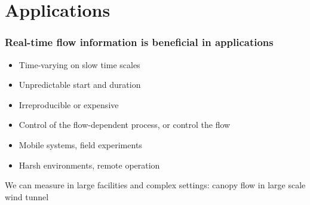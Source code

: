 %
% 
%
%
%
%
%

% 

\section{Applications}

\begin{frame}[label=app-1]
\frametitle{Real-time flow information is beneficial in applications}
\begin{itemize}
	\item Time-varying on slow time scales
    \item Unpredictable start and duration 
    \item Irreproducible or expensive %
	\item Control of the flow-dependent process, or control the flow %
    \item Mobile systems, field experiments
    \item Harsh environments, remote operation
\end{itemize}
\end{frame}




\begin{frame}[label=iibr-4]{We can measure in large facilities and complex settings: canopy flow in large scale wind tunnel}
\begin{columns}
\end{columns}
\end{frame}

